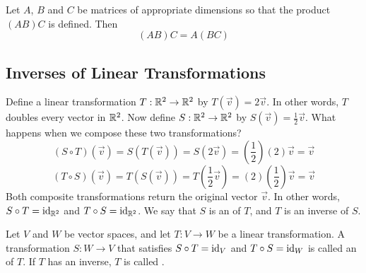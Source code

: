 \documentclass{ximera}
\begin{document}
\begin{theorem} \label{th:associativematrixmult}  Let $A$, $B$ and $C$ be matrices of appropriate dimensions so that the product $(AB)C$ is defined.  Then
$$(AB)C=A(BC)$$
\end{theorem}

\subsection*{Inverses of Linear Transformations}

\begin{exploration}\label{ep:inverse} Define a linear transformation $T:\mathbb{R}^2\rightarrow \mathbb{R}^2$ by $T(\vec{v})=2\vec{v}$.  In other words, $T$ doubles every vector in $\mathbb{R}^2$.  Now define $S:\mathbb{R}^2\rightarrow \mathbb{R}^2$ by $S(\vec{v})=\frac{1}{2}\vec{v}$.  What happens when we compose these two transformations?
$$(S\circ T)(\vec{v})=S(T(\vec{v}))=S(2\vec{v})=\left(\frac{1}{2}\right)(2)\vec{v}=\vec{v}$$
$$(T\circ S)(\vec{v})=T(S(\vec{v}))=T(\frac{1}{2}\vec{v})=(2)\left(\frac{1}{2}\right)\vec{v}=\vec{v}$$
Both composite transformations return the original vector $\vec{v}$.  In other words, $S\circ T=\text{id}_{\mathbb{R}^2}$ and $T\circ S=\text{id}_{\mathbb{R}^2}$.  We say that $S$ is an  of $T$, and $T$ is an inverse of $S$.
\end{exploration}

\begin{definition}\label{def:inverseoflintrans} Let $V$ and $W$ be vector spaces, and let $T:V\rightarrow W$ be a linear transformation.  A transformation $S:W\rightarrow V$ that satisfies $S\circ T=\text{id}_V$ and $T\circ S=\text{id}_W$ is called an  of $T$. If $T$ has an inverse, $T$ is called .
\end{definition}
\end{document}
